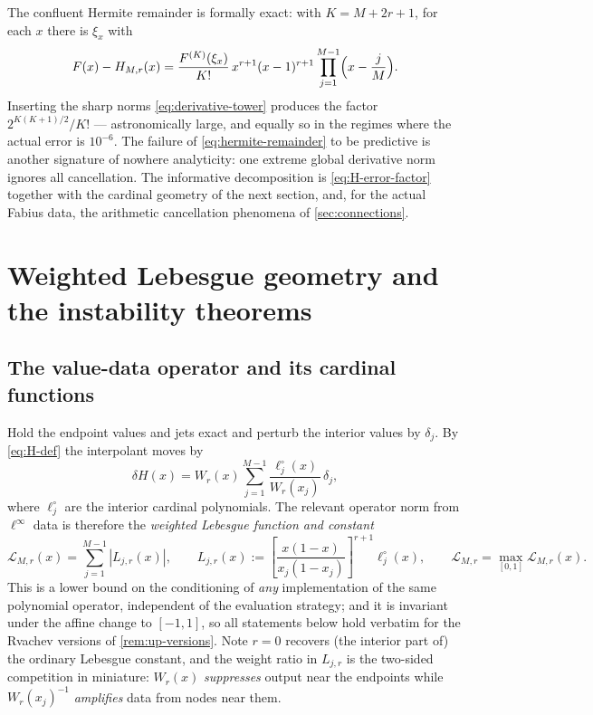 \documentclass[11pt,oneside]{article}
\numberwithin{equation}{section}
\theoremstyle{definition}
\theoremstyle{remark}
\newcommand{\abs}[1]{\left\lvert #1\right\rvert}
\newcommand{\Leb}{\mathscr L}
\begin{document}
The confluent Hermite remainder is formally exact: with
$K=M+2r+1$, for each $x$ there is $\xi_x$ with
\begin{equation}
 F(x)-H_{M,r}(x)
 =\frac{F^{(K)}(\xi_x)}{K!}\,
 x^{r+1}(x-1)^{r+1}\prod_{j=1}^{M-1}\Bigl(x-\frac jM\Bigr).
 \label{eq:hermite-remainder}
\end{equation}
Inserting the sharp norms \eqref{eq:derivative-tower} produces the
factor $2^{K(K+1)/2}/K!$ --- astronomically large, and equally so in
the regimes where the actual error is $10^{-6}$.  The failure of
\eqref{eq:hermite-remainder} to be predictive is another signature of
nowhere analyticity: one extreme global derivative norm ignores all
cancellation.  The informative decomposition is
\eqref{eq:H-error-factor} together with the cardinal geometry of the
next section, and, for the actual Fabius data, the arithmetic
cancellation phenomena of \cref{sec:connections}.

\section{Weighted Lebesgue geometry and the instability theorems}
\label{sec:conditioning}

\subsection{The value-data operator and its cardinal functions}

Hold the endpoint values and jets exact and perturb the interior
values by $\delta_j$.  By \eqref{eq:H-def} the interpolant moves by
\begin{equation}
 \delta H(x)=W_r(x)\sum_{j=1}^{M-1}
 \frac{\ell^{\circ}_j(x)}{W_r(x_j)}\,\delta_j,
 \label{eq:perturbation}
\end{equation}
where $\ell^{\circ}_j$ are the interior cardinal polynomials.  The
relevant operator norm from $\ell^\infty$ data is therefore the
\emph{weighted Lebesgue function and constant}
\begin{equation}
 \Leb_{M,r}(x)=\sum_{j=1}^{M-1}
 \abs{L_{j,r}(x)},
 \qquad
 L_{j,r}(x):=\left[\frac{x(1-x)}{x_j(1-x_j)}\right]^{r+1}
 \ell^{\circ}_j(x),
 \qquad
 \Leb_{M,r}=\max_{[0,1]}\Leb_{M,r}(x).
 \label{eq:weighted-lebesgue}
\end{equation}
This is a lower bound on the conditioning of \emph{any}
implementation of the same polynomial operator, independent of the
evaluation strategy; and it is invariant under the affine change to
$[-1,1]$, so all statements below hold verbatim for the Rvachev
versions of \cref{rem:up-versions}.  Note $r=0$ recovers (the
interior part of) the ordinary Lebesgue constant, and the weight
ratio in $L_{j,r}$ is the two-sided competition in miniature:
$W_r(x)$ \emph{suppresses} output near the endpoints while
$W_r(x_j)^{-1}$ \emph{amplifies} data from nodes near them.
\end{document}
